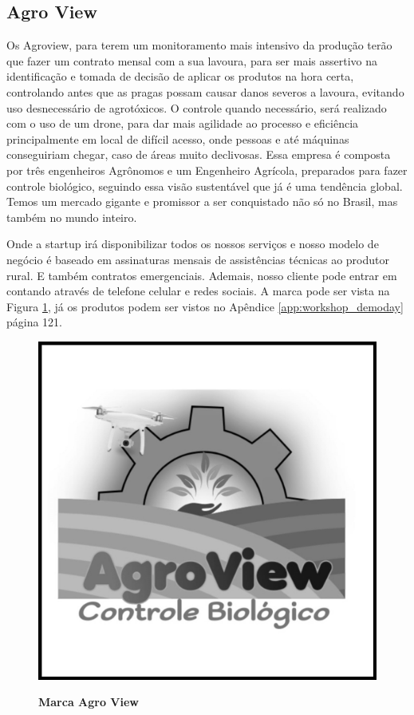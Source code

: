 \subsection{Agro View}


Os Agroview, para terem um monitoramento mais intensivo da produção terão que fazer um contrato mensal com a sua lavoura, para ser mais assertivo na identificação e tomada de decisão de aplicar os produtos na hora certa, controlando antes que as pragas possam causar danos severos a lavoura, evitando uso desnecessário de agrotóxicos. O controle quando necessário, será realizado com o uso de um drone, para dar mais agilidade ao processo e eficiência principalmente em local de difícil acesso, onde pessoas e até máquinas conseguiriam chegar, caso de áreas muito declivosas. Essa empresa é composta por três engenheiros Agrônomos e um Engenheiro Agrícola, preparados para fazer controle biológico, seguindo essa visão sustentável que já é uma tendência global. Temos um mercado gigante e promissor a ser conquistado não só no Brasil, mas também no mundo inteiro.

Onde a startup irá disponibilizar todos os nossos serviços e nosso modelo de negócio é baseado em assinaturas mensais de assistências técnicas ao produtor rural. E também contratos emergenciais. Ademais, nosso cliente pode entrar em contando através de telefone celular e redes sociais. A marca pode ser vista na Figura \ref{figura_19}, já os produtos podem ser vistos no Apêndice \ref{app:workshop_demoday} página 121.


\begin{figure}[!htb]
\centering
\caption{\textbf{Marca Agro View}}
\includegraphics[scale=0.13]{Imagens/agroview.jpg}
\label{figura_19}
\end{figure}


